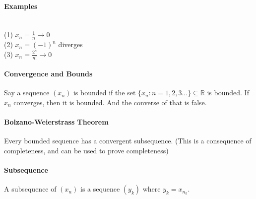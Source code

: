 \documentclass[10pt,letter]{article}
\begin{document}
\paragraph*{Examples}\mbox{}\\
(1) $x_n = \frac{1}{n} \rightarrow 0$\\
(2) $x_n = (-1)^n$ diverges \\ 
(3) $x_n = \frac{2^n}{n!} \rightarrow 0$\\

\paragraph*{Convergence and Bounds}
Say a sequence $(x_n)$ is bounded if the set $\{x_n: n=1,2,3...\}\subseteq\mathbb{R}$ is bounded. If $x_n$ converges, then it is bounded. And the converse of that is false. 

\paragraph*{Bolzano-Weierstrass Theorem}
Every bounded sequence has a convergent subsequence. (This is a consequence of completeness, and can be used to prove completeness)

\paragraph*{Subsequence}
A subsequence of $(x_n)$ is a sequence $(y_k)$ where $y_k = x_{n_k}$. 
\end{document}
